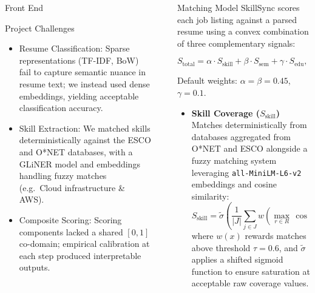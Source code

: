 \documentclass[final]{beamer}
\newlength{\sepwidth}
\newlength{\colwidth}
\newcommand{\separatorcolumn}{\begin{column}{\sepwidth}\end{column}}
\begin{document}
\begin{frame}[t]
\begin{columns}[t]
\begin{column}{\colwidth}
\begin{block}{Front End}
  \end{block}

  \begin{block}{Project Challenges}
  	\begin{itemize}
  		\item Resume Classification: Sparse representations (TF-IDF, BoW) fail to capture semantic nuance in resume text; we instead used dense embeddings, yielding acceptable classification accuracy.
  		\item Skill Extraction: We matched skills deterministically against the ESCO and O*NET databases, with a GLiNER model and embeddings handling fuzzy matches (e.g.\ Cloud infrastructure \& AWS).
  		\item Composite Scoring: Scoring components lacked a shared $[0,1]$ co-domain; empirical calibration at each step produced interpretable outputs.
  	\end{itemize}
  	
  \end{block}

\end{column}

\separatorcolumn

\begin{column}{\colwidth}

  \begin{exampleblock}{Matching Model}
    \small %
    SkillSync scores each job listing against a parsed resume using a convex
    combination of three complementary signals:

    \begin{equation}
        S_{\text{total}} = \alpha \cdot S_{\text{skill}} + \beta \cdot S_{\text{sem}} + \gamma \cdot S_{\text{edu}}, \quad \alpha + \beta + \gamma = 1
    \end{equation}

    Default weights: $\alpha = \beta = 0.45$, $\gamma = 0.1$.

    \begin{itemize}
        \item \textbf{Skill Coverage ($S_{\text{skill}}$)} \\
        Matches deterministically from databases aggregated from O*NET and ESCO alongside a fuzzy matching system leveraging {\tt all-MiniLM-L6-v2} embeddings and cosine similarity:
        \begin{equation}
            S_{\text{skill}} = \tilde{\sigma}\left(\frac{1}{|J|} \sum_{j \in J} w\!\left(\max_{r \in R}\, \cos(e_j,\, e_r)\right)\right)
        \end{equation}
        where $w(x)$ rewards matches above threshold $\tau = 0.6$, and $\tilde{\sigma}$ applies a shifted sigmoid function to ensure saturation at acceptable raw coverage values.


\end{itemize}
\end{exampleblock}
\end{column}
\end{columns}
\end{frame}
\end{document}
